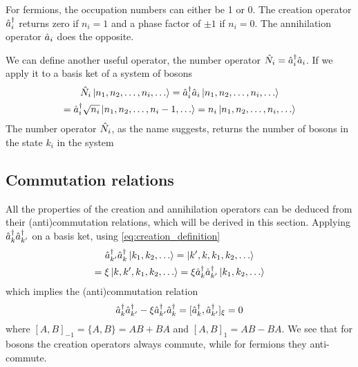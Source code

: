 
For fermions, the occupation numbers can either be 1 or 0. The creation operator $\hat{a}_i^\dagger$ returns zero if $n_i=1$ and a phase factor of $\pm 1$ if $n_i=0$. The annihilation operator $\hat{a}_i$ does the opposite.

We can define another useful operator, the number operator $\hat{N}_i = \hat{a}_i^\dagger\hat{a}_i$. If we apply it to a basis ket of a system of bosons
\begin{multline} \label{eq:number_operator}
    \hat{N}_i \ket{n_1, n_2, \dots, n_i, \dots}
    = \hat{a}_i^\dagger\hat{a}_i \ket{n_1, n_2, \dots, n_i, \dots}
    \\ = \hat{a}_i^\dagger \sqrt{n_i} \ket{n_1, n_2, \dots, n_i-1, \dots}
    = n_i \ket{n_1, n_2, \dots, n_i, \dots}
\end{multline}
The number operator $\hat{N}_i$, as the name suggests, returns the number of bosons in the state $k_i$ in the system

\subsection{Commutation relations}
All the properties of the creation and annihilation operators can be deduced from their (anti)commutation relations, which will be derived in this section. Applying $\hat{a}^\dagger_k\hat{a}^\dagger_{k'}$ on a basis ket, using  \cref{eq:creation_definition}
\begin{multline}
    \hat{a}^\dagger_{k'}\hat{a}^\dagger_k \ket{k_1, k_2, \dots}
    = \ket{k',k,k_1, k_2, \dots}
    \\= \xi \ket{k,k',k_1, k_2, \dots}
    = \xi \hat{a}^\dagger_k\hat{a}^\dagger_{k'}\ket{k_1, k_2, \dots}
\end{multline}
which implies the (anti)commutation relation
\begin{equation}
    \hat{a}^\dagger_k\hat{a}^\dagger_{k'} - \xi \hat{a}^\dagger_{k'}\hat{a}^\dagger_k = [\hat{a}^\dagger_k, \hat{a}^\dagger_{k'}]_\xi = 0
\end{equation}
where $[A,B]_{-1} = \{A,B\} = AB+BA$ and $[A,B]_{1} = AB - BA$. We see that for bosons the creation operators always commute, while for fermions they anti-commute.

